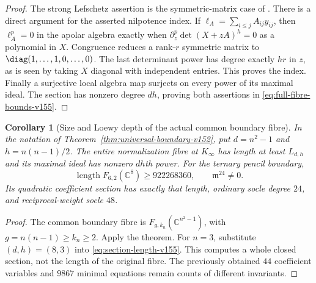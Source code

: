 \documentclass[11pt,reqno]{amsart}
\numberwithin{equation}{section}
\newtheorem{corollary}[theorem]{Corollary}
\theoremstyle{definition}\newtheorem{definition}[theorem]{Definition}
\theoremstyle{remark}\newtheorem{remark}[theorem]{Remark}
\newcommand{\C}{\mathbb C}\newcommand{\Q}{\mathbb Q}
\DeclareMathOperator{\length}{length}
\begin{document}
\begin{proof}
The strong Lefschetz assertion is the symmetric-matrix case of
\cite[Theorem~4 and Example~5]{NagaokaWachi2024}.
There is a direct argument for the asserted nilpotence index.
If $\ell_A=\sum_{i\leq j}A_{ij}y_{ij}$, then
$\ell_A^p=0$ in the apolar algebra exactly when
$\partial_z^p\det(X+zA)^h=0$ as a polynomial in $X$.
Congruence reduces a rank-$r$ symmetric matrix to
$\diag(1,\ldots,1,0,\ldots,0)$.
The last determinant power has degree exactly $hr$ in $z$, as
is seen by taking $X$ diagonal with independent entries.
This proves the index.  Finally a surjective local algebra map
surjects on every power of its maximal ideal.  The section has
nonzero degree $dh$, proving both assertions in
\eqref{eq:full-fibre-bounds-v155}.
\end{proof}

\begin{corollary}[Size and Loewy depth of the actual common boundary fibre]
\label{cor:boundary-size-v155}
In the notation of Theorem~\ref{thm:universal-boundary-v152}, put
$d=n^2-1$ and $h=n(n-1)/2$.  The entire normalization fibre at
$K_\infty$ has length at least $L_{d,h}$ and its maximal ideal has
nonzero $dh$th power.  For the ternary pencil boundary,
\begin{equation}\label{eq:ternary-large-section-v155}
 \length F_{6,2}(\C^8)\geq922268360,
       \qquad\mathfrak m^{24}\ne0.
\end{equation}
Its quadratic coefficient section has exactly that length, ordinary
socle degree $24$, and reciprocal-weight socle $48$.
\end{corollary}
\begin{proof}
The common boundary fibre is $F_{g,k_n}(\C^{n^2-1})$, with
$g=n(n-1)\geq k_n\geq2$.  Apply the theorem.
For $n=3$, substitute $(d,h)=(8,3)$ into
\eqref{eq:section-length-v155}.
This computes a whole closed section, not the length of the original
fibre.  The previously obtained $44$ coefficient variables and
$9867$ minimal equations remain counts of different invariants.
\end{proof}
\end{document}
